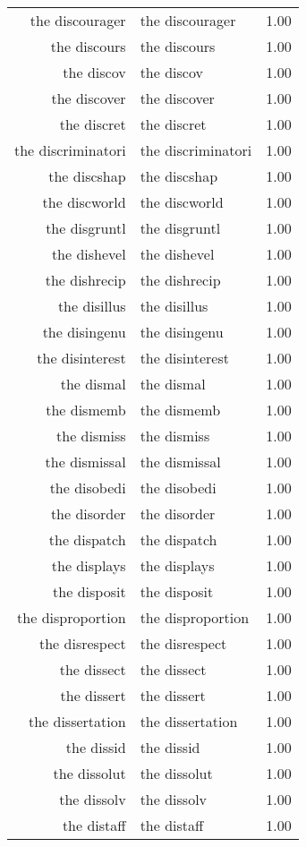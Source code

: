 \begin{table}[ht]
\begin{tabular}{rlr}
  the discourager & the discourager & 1.00 \\ 
  the discours & the discours & 1.00 \\ 
  the discov & the discov & 1.00 \\ 
  the discover & the discover & 1.00 \\ 
  the discret & the discret & 1.00 \\ 
  the discriminatori & the discriminatori & 1.00 \\ 
  the discshap & the discshap & 1.00 \\ 
  the discworld & the discworld & 1.00 \\ 
  the disgruntl & the disgruntl & 1.00 \\ 
  the dishevel & the dishevel & 1.00 \\ 
  the dishrecip & the dishrecip & 1.00 \\ 
  the disillus & the disillus & 1.00 \\ 
  the disingenu & the disingenu & 1.00 \\ 
  the disinterest & the disinterest & 1.00 \\ 
  the dismal & the dismal & 1.00 \\ 
  the dismemb & the dismemb & 1.00 \\ 
  the dismiss & the dismiss & 1.00 \\ 
  the dismissal & the dismissal & 1.00 \\ 
  the disobedi & the disobedi & 1.00 \\ 
  the disorder & the disorder & 1.00 \\ 
  the dispatch & the dispatch & 1.00 \\ 
  the displays & the displays & 1.00 \\ 
  the disposit & the disposit & 1.00 \\ 
  the disproportion & the disproportion & 1.00 \\ 
  the disrespect & the disrespect & 1.00 \\ 
  the dissect & the dissect & 1.00 \\ 
  the dissert & the dissert & 1.00 \\ 
  the dissertation & the dissertation & 1.00 \\ 
  the dissid & the dissid & 1.00 \\ 
  the dissolut & the dissolut & 1.00 \\ 
  the dissolv & the dissolv & 1.00 \\ 
  the distaff & the distaff & 1.00 \\ 

\end{tabular}
\end{table}
